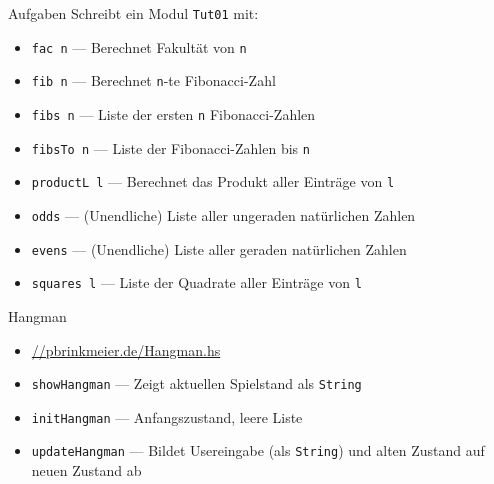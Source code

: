 \documentclass{beamer}
\begin{document}
\begin{frame}{Aufgaben}
	Schreibt ein Modul \texttt{Tut01} mit:

	\begin{itemize}
		\item \texttt{fac n} --- Berechnet Fakultät von \texttt{n}
		\item \texttt{fib n} --- Berechnet \texttt{n}-te Fibonacci-Zahl
		\item \texttt{fibs n} --- Liste der ersten \texttt{n} Fibonacci-Zahlen
		\item \texttt{fibsTo n} --- Liste der Fibonacci-Zahlen bis \texttt{n}
		\item \texttt{productL l} --- Berechnet das Produkt aller Einträge von \texttt{l}
		\item \texttt{odds} --- (Unendliche) Liste aller ungeraden natürlichen Zahlen
		\item \texttt{evens} --- (Unendliche) Liste aller geraden natürlichen Zahlen
		\item \texttt{squares l} --- Liste der Quadrate aller Einträge von \texttt{l}
	\end{itemize}
\end{frame}

\begin{frame}{Hangman}
	\begin{itemize}
		\item \url{//pbrinkmeier.de/Hangman.hs}
		\item \texttt{showHangman} --- Zeigt aktuellen Spielstand als \texttt{String}
		\item \texttt{initHangman} --- Anfangszustand, leere Liste
		\item \texttt{updateHangman} --- Bildet Usereingabe (als \texttt{String}) und alten Zustand auf neuen Zustand ab
	\end{itemize}
\end{frame}
\end{document}
